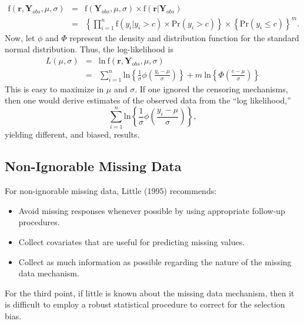 \begin{eqnarray*}
\mathrm{f}(\mathbf{r}, \mathbf{Y}_{obs}, \mu, \sigma) &=&
\mathrm{f}(\mathbf{Y}_{obs}, \mu, \sigma) \times
\mathrm{f}(\mathbf{r} | \mathbf{Y}_{obs}) \\
&=& \left\{ \prod_{i=1}^n   \mathrm{f}(y_i | y_i > c) \times
\mathrm{Pr}(y_i > c) \right\}
 \times \left\{\mathrm{Pr}(y_i \leq c)\right\}^m.
\end{eqnarray*}
Now, let $\phi$ and $\Phi$ represent the density and distribution
function for the standard normal distribution. Thus, the
log-likelihood is
\begin{eqnarray*}
L(\mu, \sigma) &=& \mathrm{ln~} \mathrm{f}(\mathbf{r},
\mathbf{Y}_{obs}, \mu, \sigma) \\
&=& \sum_{i=1}^n \mathrm{ln}\left\{ \frac{1}{\sigma} \phi \left(
\frac{y_i-\mu}{\sigma} \right)
 \right\}
 +  m~ \mathrm{ln}\left\{ \Phi \left(
\frac{c-\mu}{\sigma}\right) \right\}
\end{eqnarray*}
This is easy to maximize in $\mu$ and $\sigma$. If one ignored the
censoring mechanisms, then one would derive estimates of the
observed data from the ``log likelihood,''
\begin{equation*}
\sum_{i=1}^n \mathrm{ln}\left\{ \frac{1}{\sigma} \phi \left(
\frac{y_i-\mu}{\sigma} \right)
 \right\},
\end{equation*}
yielding different, and biased, results.

\linejed

\subsection{Non-Ignorable Missing Data}\label{S6:NonIgnore}

For non-ignorable missing data, Little (1995) recommends:
    \begin{itemize}
      \item Avoid missing responses whenever possible by using appropriate
follow-up procedures.
      \item Collect covariates that are useful for predicting missing
values.
      \item Collect as much information as possible regarding the
nature of the missing data mechanism.
    \end{itemize}
For the third point, if little is known about the missing data
mechanism, then it is difficult to employ a robust statistical
procedure to correct for the selection bias.

